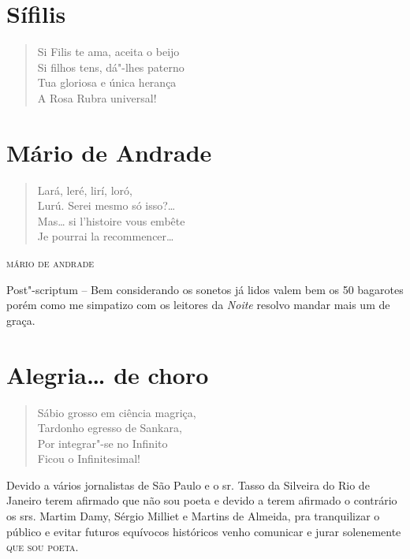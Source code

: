 {\medskip
\section*{Sífilis}

\begin{verse}
Si Filis te ama, aceita o beijo\\
Si filhos tens, dá"-lhes paterno\\
Tua gloriosa e única herança\\
A Rosa Rubra universal!
\end{verse}

\medskip
\section*{Mário de Andrade}

\begin{verse}
Lará, leré, lirí, loró,\\
Lurú. Serei mesmo só isso?\ldots{}\\
Mas\ldots{} si l'histoire vous embête\\
Je pourrai la recommencer\ldots{}
\end{verse}

\hfill\textsc{mário de andrade}

\parbox{\textwidth}{
Post"-scriptum -- Bem considerando os sonetos já lidos valem bem os 50
bagarotes porém como me simpatizo com os leitores da \emph{Noite}
resolvo mandar mais um de graça.}


\bigskip
\section*{Alegria\ldots{} de choro}

\begin{verse}
Sábio grosso em ciência magriça,\\
Tardonho egresso de Sankara,\\
Por integrar"-se no Infinito\\
Ficou o Infinitesimal!
\end{verse}


\medskip

\begingroup\centering\parbox{165pt}{
Devido a vários jornalistas de São Paulo e o sr. Tasso da Silveira do
Rio de Janeiro terem afirmado que não sou poeta e devido a terem
afirmado o contrário os srs. Martim Damy, Sérgio Milliet e Martins de
Almeida, pra tranquilizar o público e evitar futuros equívocos
históricos venho comunicar e jurar solenemente \textsc{que sou poeta.}\medskip

}}

